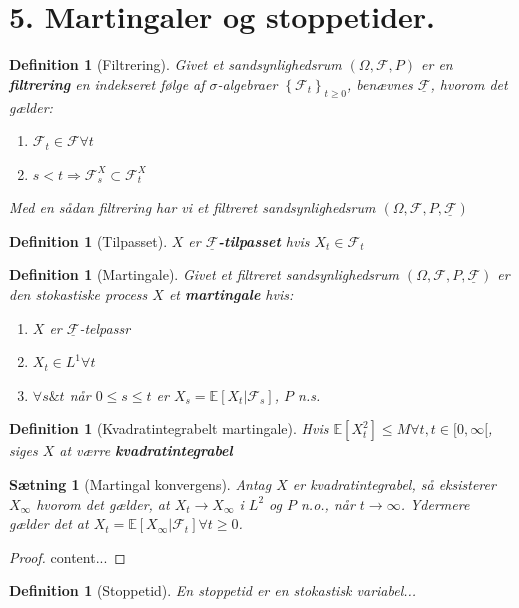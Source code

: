 \documentclass[12pt]{report}
\newtheorem{theorem}[lemma]{Sætning}
\newtheorem{definition}[lemma]{Definition}
\theoremstyle{break}
\newtheorem*{proof}{Bevis}
\theoremstyle{break}
\newcommand{\EE}{\mathbb{E}}
\newcommand{\FI}{\mathcal{F}}
\newcommand{\FIU}{\underline{\mathcal{F}}}
\newcommand{\1}{\mathds{1}}
\begin{document}
\section*{5. Martingaler og stoppetider.}
\begin{definition}[Filtrering]
	Givet et sandsynlighedsrum $(\Omega, \FI, P)$ er en \textbf{filtrering} en indekseret følge af $\sigma$-algebraer $\left\{ \FI_t \right\}_{t\geq 0}$,  benævnes $\FIU$, hvorom det gælder:
	\begin{enumerate}
		\item $\FI_t \in \FI \forall t$
		\item $s<t \Rightarrow \FI_s^X\subset \FI_t^X$
	\end{enumerate}
	Med en sådan filtrering har vi et filtreret sandsynlighedsrum $(\Omega, \FI, P,\FIU)$
\end{definition}

\begin{definition}[Tilpasset]
	$X$ er \textbf{$\FIU$-tilpasset} hvis $X_t\in\FI_t$
\end{definition}

\begin{definition}[Martingale]
	Givet et filtreret sandsynlighedsrum $(\Omega, \FI, P,\FIU)$ er den stokastiske process $X$ et \textbf{martingale} hvis:
	\begin{enumerate}
		\item $X$ er $\FIU$-telpassr
		\item $X_t\in L^1 \forall t$
		\item $\forall s \& t$ når $0\leq s \leq t$ er $X_s=\EE[X_t\vert \FI_s]$, $P$ n.s.
	\end{enumerate}
\end{definition}

\begin{definition}[Kvadratintegrabelt martingale]
	Hvis $\EE \left[ X_t^2 \right]\leq M \forall t,t\in[ 0,\infty [$, siges $X$ at værre \textbf{kvadratintegrabel}
\end{definition}

\begin{theorem}[Martingal konvergens]
	Antag $X$ er kvadratintegrabel, så eksisterer $X_\infty$ hvorom det gælder, at $X_t\to X_\infty$ i $L^2$ og $P$ n.o., når $t\to \infty$.
	Ydermere gælder det at $X_t=\EE[ X_\infty\vert\FI_t ]\forall t\geq 0$.
\end{theorem}
\begin{proof}
	content...
\end{proof}
\begin{definition}[Stoppetid]
	En stoppetid er en stokastisk variabel...
\end{definition}
\end{document}
